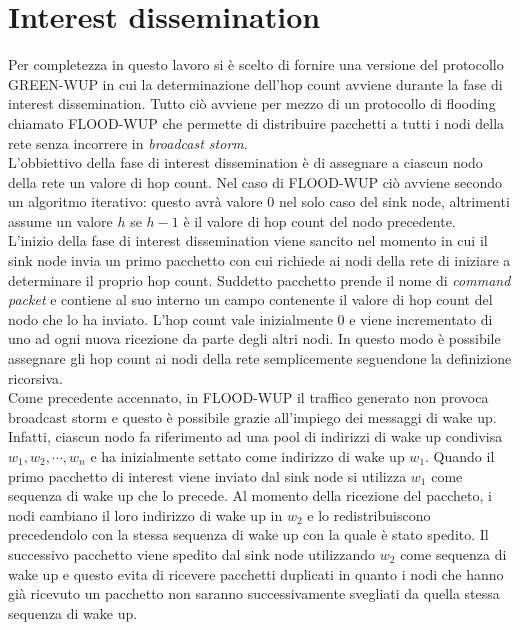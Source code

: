\documentclass[binding=0.6cm,TFA]{sapthesis}
\begin{document}
\section{Interest dissemination}

Per completezza in questo lavoro si è scelto di fornire una versione del protocollo GREEN-WUP in cui la determinazione dell'hop count avviene
durante la fase di interest dissemination. Tutto ciò avviene per mezzo di un protocollo di flooding chiamato FLOOD-WUP \cite{novel-wake-up-receiver-paper}
che permette di distribuire pacchetti a tutti i nodi della rete senza incorrere in \emph{broadcast storm}.\\

L'obbiettivo della fase di interest dissemination è di assegnare a ciascun nodo della rete un valore di hop count. Nel caso di FLOOD-WUP ciò
avviene secondo un algoritmo iterativo: questo avrà valore 0 nel solo caso del sink node, altrimenti assume un valore $h$ se $h-1$ è il valore
di hop count del nodo precedente.\\

L'inizio della fase di interest dissemination viene sancito nel momento in cui il sink node invia un primo pacchetto con cui richiede
ai nodi della rete di iniziare a determinare il proprio hop count. Suddetto pacchetto prende il nome di \emph{command packet} e contiene
al suo interno un campo contenente il valore di hop count del nodo che lo ha inviato. L'hop count vale inizialmente 0 
e viene incrementato di uno ad ogni nuova ricezione da parte degli altri nodi. In questo modo è possibile assegnare gli hop count ai nodi
della rete semplicemente seguendone la definizione ricorsiva.\\

Come precedente accennato, in FLOOD-WUP il traffico generato non provoca broadcast storm e questo è possibile grazie all'impiego dei messaggi
di wake up. Infatti, ciascun nodo fa riferimento ad una pool di indirizzi di wake up condivisa $w_1, w_2, \cdots, w_n$ e ha inizialmente
settato come indirizzo di wake up $w_1$. Quando il primo pacchetto di interest viene inviato dal sink node si utilizza $w_1$ come sequenza
di wake up che lo precede. Al momento della ricezione del paccheto, i nodi cambiano il loro indirizzo di wake up in $w_2$ e lo redistribuiscono
precedendolo con la stessa sequenza di wake up con la quale è stato spedito. Il successivo pacchetto viene spedito dal sink
node utilizzando $w_2$ come sequenza di wake up e questo evita di ricevere pacchetti duplicati in quanto i nodi che hanno già ricevuto un
pacchetto non saranno successivamente svegliati da quella stessa sequenza di wake up.
\end{document}
